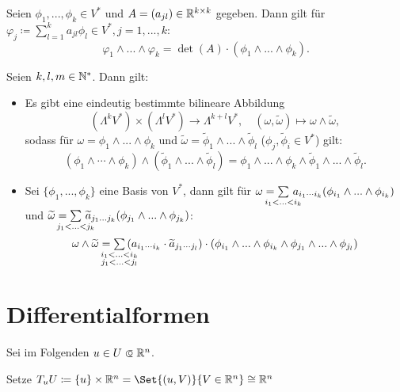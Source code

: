 \documentclass{cheat-sheet}
\theoremstyle{definition}
\begin{document}
\begin{samepage}

\begin{prop}
  Seien $\phi_1, ..., \phi_k \in V^*$ und $A = (a_{jl}) \in \mathbb{R}^{k \times k}$ gegeben.
  Dann gilt für $\varphi_j \coloneqq \sum_{l=1}^k a_{jl} \phi_l \in V^*, j = 1, ..., k$:
  \[ \varphi_1 \wedge ... \wedge \varphi_k = \det(A) \cdot (\phi_1 \wedge ... \wedge \phi_k). \]
\end{prop}

\begin{satz}
  Seien $k, l, m \in \mathbb{N}^*$. Dann gilt:
  \begin{itemize}
    \item Es gibt eine eindeutig bestimmte bilineare Abbildung
    \[ (\Lambda^k V^*) \times (\Lambda^l V^*) \to \Lambda^{k+l} V^*, \quad (\omega, \widetilde{\omega}) \mapsto \omega \wedge \widetilde{\omega}, \]
    sodass für $\omega = \phi_1 \wedge ... \wedge \phi_k$ und $\widetilde{\omega} = \widetilde{\phi}_1 \wedge ... \wedge \widetilde{\phi}_l$ ($\phi_j, \widetilde{\phi}_i \in V^*$) gilt:
    \[ (\phi_1 \wedge \cdots \wedge \phi_k) \wedge (\widetilde{\phi}_1 \wedge ... \wedge \widetilde{\phi}_l) = \phi_1 \wedge ... \wedge \phi_k \wedge \widetilde{\phi}_1 \wedge ... \wedge \widetilde{\phi}_l. \]
    \item Sei $\{ \phi_1 , ..., \phi_k \}$ eine Basis von $V^*$, dann gilt für $\omega = \sum_{\mathclap{i_1 < ... < i_k}} \, a_{i_1 \cdots i_k} (\phi_{i_1} \wedge ... \wedge \phi_{i_k})$ und $\widetilde{\omega} = \sum_{\mathclap{j_1 < ... < j_k}} \, \widetilde{a}_{j_1 ... j_k} (\phi_{j_1} \wedge ... \wedge \phi_{j_k})$:
    \[ \omega \wedge \widetilde{\omega} = \sum_{\mathclap{\substack{i_1 < ... < i_k \\ j_1 < ... < j_l}}} \, (a_{i_1 \cdots i_k} \cdot \widetilde{a}_{j_1 \cdots j_l}) \cdot (\phi_{i_1} \wedge ... \wedge \phi_{i_k} \wedge \phi_{j_1} \wedge ... \wedge \phi_{j_l}) \]
  \end{itemize}
\end{satz}


\section{Differentialformen}

\end{samepage}


\begin{nota}
  Sei im Folgenden $u \in U \opn \R^n$.

  Setze $T_u U \coloneqq \{ u \} \times \R^n = \Set{ (u, V) }{ V \in \R^n } \cong \R^n$
\end{nota}
\end{document}
